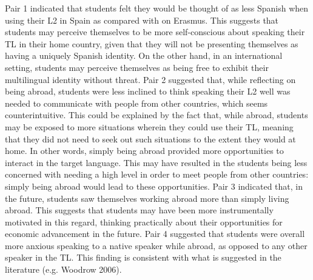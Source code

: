 \documentclass[12pt]{article}
\newenvironment{styleStandard}{\setlength\leftskip{0cm}\setlength\rightskip{0cm plus 1fil}\setlength\parindent{0cm}\setlength\parfillskip{0pt plus 1fil}\setlength\parskip{0in plus 1pt}\writerlistparindent\writerlistleftskip\leavevmode\normalfont\normalsize\writerlistlabel\ignorespaces}{\unskip\vspace{0.111in plus 0.0111in}\par}
\newcommand\writerlistleftskip{}
\newcommand\writerlistparindent{}
\newcommand\writerlistlabel{}
\begin{document}
\begin{styleStandard}
Pair 1 indicated that students felt they would be thought of as less Spanish when using their L2 in Spain as compared with on Erasmus. This suggests that students may perceive themselves to be more self-conscious about speaking their TL in their home country, given that they will not be presenting themselves as having a uniquely Spanish identity. On the other hand, in an international setting, students may perceive themselves as being free to exhibit their multilingual identity without threat. Pair 2 suggested that, while reflecting on being abroad, students were less inclined to think speaking their L2 well was needed to communicate with people from other countries, which seems counterintuitive. This could be explained by the fact that, while abroad, students may be exposed to more situations wherein they could use their TL, meaning that they did not need to seek out such situations to the extent they would at home. In other words, simply being abroad provided more opportunities to interact in the target language. This may have resulted in the students being less concerned with needing a high level in order to meet people from other countries: simply being abroad would lead to these opportunities. Pair 3 indicated that, in the future, students saw themselves working abroad more than simply living abroad. This suggests that students may have been more instrumentally motivated in this regard, thinking practically about their opportunities for economic advancement in the future. Pair 4 suggested that students were overall more anxious speaking to a native speaker while abroad, as opposed to any other speaker in the TL. This finding is consistent with what is suggested in the literature (e.g. Woodrow 2006).
\end{styleStandard}
\end{document}
